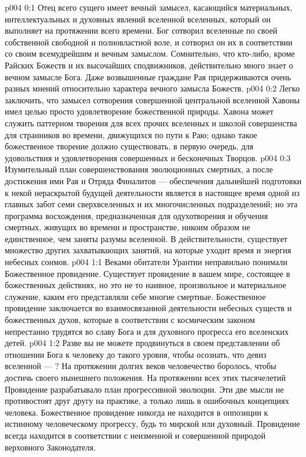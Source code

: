 \author{Божественный Советник}
\vs p004 0:1 Отец всего сущего имеет вечный замысел, касающийся материальных, интеллектуальных и духовных явлений вселенной вселенных, который он выполняет на протяжении всего времени. Бог сотворил вселенные по своей собственной свободной и полновластной воле, и сотворил он их в соответствии со своим всемудрейшим и вечным замыслом. Сомнительно, что кто\hyp{}либо, кроме Райских Божеств и их высочайших сподвижников, действительно много знает о вечном замысле Бога. Даже возвышенные граждане Рая придерживаются очень разных мнений относительно характера вечного замысла Божеств.
\vs p004 0:2 Легко заключить, что замысел сотворения совершенной центральной вселенной Хавоны имел целью просто удовлетворение божественной природы. Хавона может служить паттерном творения для всех прочих вселенных и школой совершенства для странников во времени, движущихся по пути к Раю; однако такое божественное творение должно существовать, в первую очередь, для удовольствия и удовлетворения совершенных и бесконечных Творцов.
\vs p004 0:3 Изумительный план совершенствования эволюционных смертных, а после достижения ими Рая и Отряда Финалитов --- обеспечения дальнейшей подготовки к некой нераскрытой будущей деятельности является в настоящее время одной из главных забот семи сверхвселенных и их многочисленных подразделений; но эта программа восхождения, предназначенная для одухотворения и обучения смертных, живущих во времени и пространстве, никоим образом не единственное, чем заняты разумы вселенной. В действительности, существует множество других захватывающих занятий, на которые уходит время и энергия небесных сонмов.
\vs p004 1:1 Веками обитатели Урантии неправильно понимали Божественное провидение. Существует провидение в вашем мире, состоящее в божественных действиях, но это не то наивное, произвольное и материальное служение, каким его представляли себе многие смертные. Божественное провидение заключается во взаимосвязанной деятельности небесных существ и божественных духов, которые в соответствии с космическим законом непрестанно трудятся во славу Бога и для духовного прогресса его вселенских детей.
\vs p004 1:2 Разве вы не можете продвинуться в своем представлении об отношении Бога к человеку до такого уровня, чтобы осознать, что девиз вселенной ---  ? На протяжении долгих веков человечество боролось, чтобы достичь своего нынешнего положения. На протяжении всех этих тысячелетий Провидение разрабатывало план прогрессивной эволюции. Эти две мысли не противостоят друг другу на практике, а только лишь в ошибочных концепциях человека. Божественное провидение никогда не находится в оппозиции к истинному человеческому прогрессу, будь то мирской или духовный. Провидение всегда находится в соответствии с неизменной и совершенной природой верховного Законодателя.
